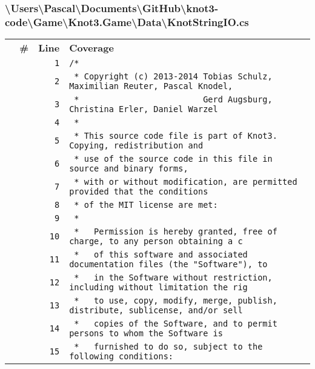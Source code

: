 \documentclass[a4paper,10pt]{article}
\begin{document}
\subsubsection{\textbackslash Users\textbackslash Pascal\textbackslash Documents\textbackslash GitHub\textbackslash knot3-code\textbackslash Game\textbackslash Knot3.Game\textbackslash Data\textbackslash KnotStringIO.cs}
\begin{longtable}[l]{lrrl}
\textbf{} & \textbf{\#} & \textbf{Line} & \textbf{Coverage}\\
\cellcolor{gray} &  & \verb~1~ & \verb~/*~\\
\cellcolor{gray} &  & \verb~2~ & \verb~ * Copyright (c) 2013-2014 Tobias Schulz, Maximilian Reuter, Pascal Knodel,~\\
\cellcolor{gray} &  & \verb~3~ & \verb~ *                         Gerd Augsburg, Christina Erler, Daniel Warzel~\\
\cellcolor{gray} &  & \verb~4~ & \verb~ *~\\
\cellcolor{gray} &  & \verb~5~ & \verb~ * This source code file is part of Knot3. Copying, redistribution and~\\
\cellcolor{gray} &  & \verb~6~ & \verb~ * use of the source code in this file in source and binary forms,~\\
\cellcolor{gray} &  & \verb~7~ & \verb~ * with or without modification, are permitted provided that the conditions~\\
\cellcolor{gray} &  & \verb~8~ & \verb~ * of the MIT license are met:~\\
\cellcolor{gray} &  & \verb~9~ & \verb~ *~\\
\cellcolor{gray} &  & \verb~10~ & \verb~ *   Permission is hereby granted, free of charge, to any person obtaining a c~\\
\cellcolor{gray} &  & \verb~11~ & \verb~ *   of this software and associated documentation files (the "Software"), to ~\\
\cellcolor{gray} &  & \verb~12~ & \verb~ *   in the Software without restriction, including without limitation the rig~\\
\cellcolor{gray} &  & \verb~13~ & \verb~ *   to use, copy, modify, merge, publish, distribute, sublicense, and/or sell~\\
\cellcolor{gray} &  & \verb~14~ & \verb~ *   copies of the Software, and to permit persons to whom the Software is~\\
\cellcolor{gray} &  & \verb~15~ & \verb~ *   furnished to do so, subject to the following conditions:~\\

\end{longtable}
\end{document}
